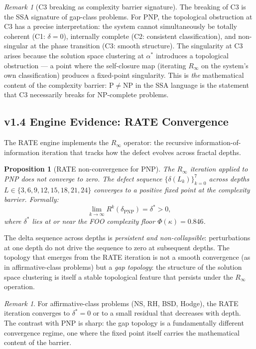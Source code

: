 \documentclass[11pt]{article}
\newtheorem{proposition}[theorem]{Proposition}
\theoremstyle{definition}
\theoremstyle{remark}
\newtheorem{remark}[theorem]{Remark}
\begin{document}
\begin{remark}[C3 breaking as complexity barrier signature]
\label{rem:c3-pnp}
The breaking of C3 is the SSA signature of gap-class problems.  For PNP,
the topological obstruction at C3 has a precise interpretation: the system
cannot simultaneously be totally coherent (C1: $\delta = 0$), internally
complete (C2: consistent classification), and non-singular at the phase
transition (C3: smooth structure).  The singularity at C3 arises because
the solution space clustering at $\alpha^*$ introduces a topological
obstruction --- a point where the self-closure map (iterating $R_\infty$
on the system's own classification) produces a fixed-point singularity.
This is \emph{the} mathematical content of the complexity barrier:
$\mathrm{P} \neq \mathrm{NP}$ in the SSA language is the statement that
C3 necessarily breaks for NP-complete problems.
\end{remark}

\subsection{v1.4 Engine Evidence: RATE Convergence}
\label{sec:rate-pnp}

The RATE engine implements the $R_\infty$ operator: the recursive
information-of-information iteration that tracks how the defect evolves
across fractal depths.

\begin{proposition}[RATE non-convergence for PNP]
\label{prop:rate-pnp}
The $R_\infty$ iteration applied to PNP does \emph{not} converge to zero.
The defect sequence $\{\delta(L_k)\}_{k=0}^{7}$ across depths
$L \in \{3, 6, 9, 12, 15, 18, 21, 24\}$ converges to a positive fixed point
at the complexity barrier.  Formally:
\[
  \lim_{k \to \infty} R^k(\delta_{\mathrm{PNP}}) = \delta^* > 0,
\]
where $\delta^*$ lies at or near the FOO complexity floor $\Phi(\kappa) = 0.846$.
\end{proposition}

\noindent
The delta sequence across depths is \emph{persistent and non-collapsible}:
perturbations at one depth do not drive the sequence to zero at subsequent
depths.  The topology that emerges from the RATE iteration is not a smooth
convergence (as in affirmative-class problems) but a \emph{gap topology}:
the structure of the solution space clustering is itself a stable
topological feature that persists under the $R_\infty$ operation.

\begin{remark}
For affirmative-class problems (NS, RH, BSD, Hodge), the RATE iteration
converges to $\delta^* = 0$ or to a small residual that decreases with
depth.  The contrast with PNP is sharp: the gap topology is a fundamentally
different convergence regime, one where the fixed point itself carries the
mathematical content of the barrier.
\end{remark}
\end{document}
